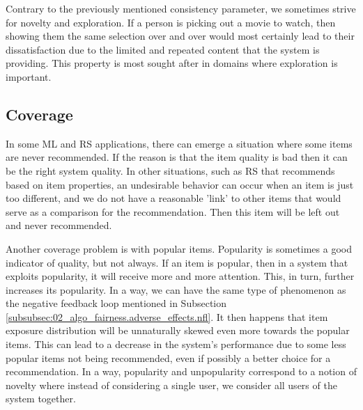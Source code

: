 




Contrary to the previously mentioned consistency parameter, we sometimes strive for novelty and exploration. If a person is picking out a movie to watch, then showing them the same selection over and over would most certainly lead to their dissatisfaction due to the limited and repeated content that the system is providing. This property is most sought after in domains where exploration is important.



\subsection*{Coverage}

In some ML and RS applications, there can emerge a situation where some items are never recommended. If the reason is that the item quality is bad then it can be the right system quality. In other situations, such as RS that recommends based on item properties, an undesirable behavior can occur when an item is just too different, and we do not have a reasonable 'link' to other items that would serve as a comparison for the recommendation. Then this item will be left out and never recommended.

Another coverage problem is with popular items. Popularity is sometimes a good indicator of quality, but not always. If an item is popular, then in a system that exploits popularity, it will receive more and more attention. This, in turn, further increases its popularity. In a way, we can have the same type of phenomenon as the negative feedback loop mentioned in Subsection \ref{subsubsec:02_algo_fairness.adverse_effects.nfl}. It then happens that item exposure distribution will be unnaturally skewed even more towards the popular items. This can lead to a decrease in the system's performance due to some less popular items not being recommended, even if possibly a better choice for a recommendation. In a way, popularity and unpopularity correspond to a notion of novelty where instead of considering a single user, we consider all users of the system together.


